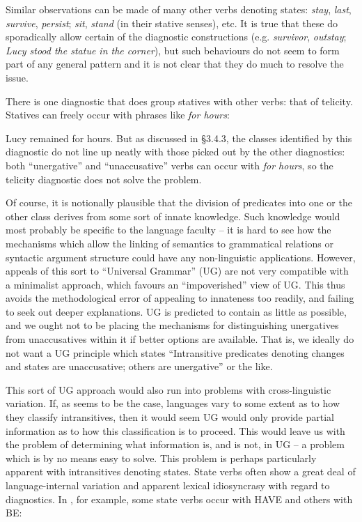 \documentclass[output=paper]{langsci/langscibook}
\begin{document}
    \z
\z
Similar observations can be made of many other verbs denoting states:
\emph{stay}, \emph{last}, \emph{survive}, \emph{persist}; \emph{sit},
\emph{stand} (in their stative senses), etc. It is true that these do
sporadically allow certain of the diagnostic constructions (e.g.
\emph{survivor}, \emph{outstay}; \emph{Lucy stood the statue in the corner}),
but such behaviours do not seem to form part of any general pattern and it is
not clear that they do much to resolve the issue.

There is one diagnostic that does group statives with other verbs: that of
telicity. Statives can freely occur with phrases like \emph{for hours}:

\ea
    Lucy remained for hours.
\z
But as discussed in §3.4.3, the classes identified by this diagnostic do not
line up neatly with those picked out by the other diagnostics: both
\enquote{unergative} and \enquote{unaccusative} verbs can occur with \emph{for
hours}, so the telicity diagnostic does not solve the problem.

Of course, it is notionally plausible that the division of predicates into one
or the other class derives from some sort of innate knowledge. Such knowledge
would most probably be specific to the language faculty – it is hard to see how
the mechanisms which allow the linking of semantics to grammatical relations or
syntactic argument structure could have any non-linguistic applications.
However, appeals of this sort to \enquote{Universal Grammar} (\gls{UG}) are not very
compatible with a minimalist approach, which favours an \enquote{impoverished}
view of UG\@. This thus avoids the methodological error of appealing to
innateness too readily, and failing to seek out deeper explanations.  \gls{UG} is
predicted to contain as little as possible, and we ought not to be placing the
mechanisms for distinguishing unergatives from unaccusatives within it if
better options are available. That is, we ideally do not want a \gls{UG} principle
which states \enquote{Intransitive predicates denoting changes and states are
unaccusative; others are unergative} or the like.

This sort of \gls{UG} approach would also run into problems with cross-linguistic
variation. If, as seems to be the case, languages vary to some extent as to how
they classify intransitives, then it would seem \gls{UG} would only provide partial
information as to how this classification is to proceed. This would leave us
with the problem of determining what information is, and is not, in \gls{UG} – a
problem which is by no means easy to solve. This problem is perhaps
particularly apparent with intransitives denoting states. State verbs often
show a great deal of language-internal variation and apparent lexical
idiosyncrasy with regard to  diagnostics. In , for
example, some state verbs occur with HAVE and others with BE:
\end{document}
